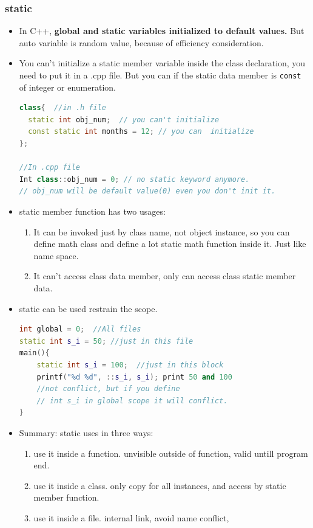\documentclass[a4paper,12pt,twoside]{book}
\begin{document}
\subsubsection{static}
\begin{itemize}

\item In C++, \textbf{global and static variables initialized to default values.}  But auto variable is random value, because of efficiency consideration.

\item You can't initialize a static member variable inside the class declaration, you need to put it in a .cpp file.   But you can if the static data member is \texttt{const} of integer or enumeration.
\begin{lstlisting}[frame=single, language=c++]
class{  //in .h file
  static int obj_num;  // you can't initialize
  const static int months = 12; // you can  initialize
};

//In .cpp file
Int class::obj_num = 0; // no static keyword anymore.
// obj_num will be default value(0) even you don't init it.
\end{lstlisting}

\item static member function has two usages:
\begin{enumerate}
\item It can be invoked just by class name, not object instance, so you can define math class and define a lot static math function inside it.  Just like name space.
\item It can't access class data member, only can access class static member data.
\end{enumerate}

\item static can be used restrain the scope.
\begin{lstlisting}[frame=single, language=c++]
int global = 0;  //All files
static int s_i = 50; //just in this file
main(){
    static int s_i = 100;  //just in this block
    printf("%d %d", ::s_i, s_i); print 50 and 100
    //not conflict, but if you define 
    // int s_i in global scope it will conflict. 
}
\end{lstlisting}

\item Summary: static uses in three ways:
\begin{enumerate}
\item use it inside a function. unvisible outside of function, valid untill program end.
\item use it inside a class. only copy for all instances, and access by static member function.
\item use it inside a file. internal link, avoid name conflict, 
\end{enumerate}

\end{itemize}
\end{document}
